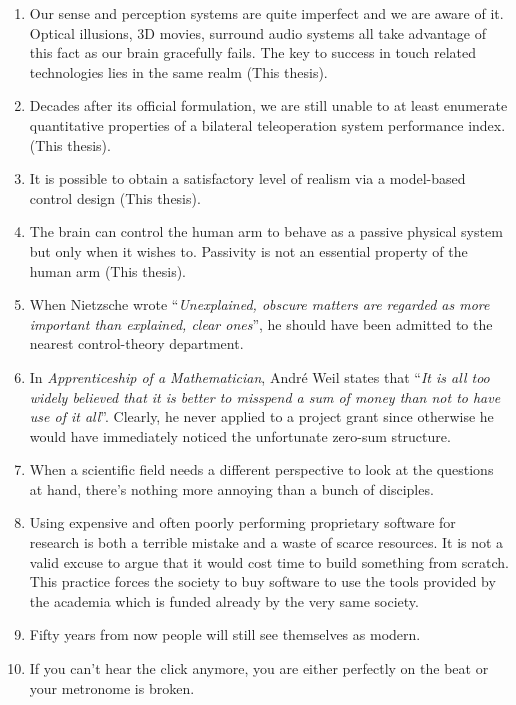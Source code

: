 \documentclass[10pt]{article}%
\newcommand{\mystelling}[1]{%
\item #1
}%
\begin{document}
\begin{enumerate}
\mystelling{Our sense and perception systems are quite imperfect and we are aware of it. Optical illusions, 
3D movies, surround audio systems all take advantage of this fact as our brain gracefully fails. The key to success 
in touch related technologies lies in the same realm (This thesis).} 

\mystelling{Decades after its official formulation, we are still unable to at least enumerate quantitative 
properties of a bilateral teleoperation system performance index. (This thesis).}

\mystelling{It is possible to obtain a satisfactory level of realism via a model-based control design (This thesis).}

\mystelling{The brain can control the human arm to behave as a passive physical system but only when it 
wishes to. Passivity is not an essential property of the human arm (This thesis).}

\mystelling{When Nietzsche wrote \enquote{\emph{Unexplained, obscure matters are regarded 
as more important than explained, clear ones}}, he should have been admitted to the 
nearest control-theory department.}

\mystelling{In \emph{Apprenticeship of a Mathematician}, Andr\'{e} Weil states that 
\enquote{\emph{It is all too widely believed that it is better to misspend a sum of 
money than not to have use of it all}}. Clearly, he never applied to a project grant
since otherwise he would have immediately noticed the unfortunate zero-sum structure.
}

\mystelling{When a scientific field needs a different perspective to look at the questions 
at hand, there's nothing more annoying than a bunch of disciples.}

\mystelling{Using expensive and often poorly performing proprietary software for research 
is both a terrible mistake and a waste of scarce resources. It is not a valid excuse to 
argue that it would cost time to build something from scratch. This practice forces the
society to buy software to use the tools provided by the academia which is funded already by 
the very same society.}

\mystelling{Fifty years from now people will still see themselves as modern.}

\mystelling{If you can't hear the click anymore, you are either perfectly on the beat or your metronome is broken.}

\end{enumerate}
\end{document}
